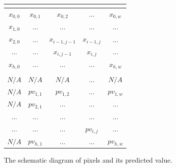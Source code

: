 \begin{figure}
	\centering
	\begin{tabular}{|c|c|c|c|c|} 
		
		\multicolumn{1}{c}{\phantom{$x_{i-1, j-1}$}} & \multicolumn{1}{c}{\phantom{$x_{i-1, j-1}$}} &
		\multicolumn{1}{c}{\phantom{$x_{i-1, j-1}$}} & \multicolumn{1}{c}{\phantom{$x_{i-1, j-1}$}} & \multicolumn{1}{c}{\phantom{$x_{i-1, j-1}$}}  
		\\
		\hline
		$x_{0, 0}$ & $x_{0, 1}$ & $x_{0, 2}$      & $\dots$    & $x_{0, w}$ \\ \hline
		$x_{1, 0}$ & $\dots$    & $\dots$         & $\dots$    & $\dots$    \\ \hline 
		$x_{2, 0}$ & $\dots$    & 
		\cellcolor{black!10} $x_{i-1, j-1}$ & \cellcolor{black!10}$x_{i - 1, j}$ & $\dots$   \\ \hline 
		$\dots$    & $\dots$    & 
		\cellcolor{black!10}$x_{i, j - 1}$  & \cellcolor{black!20}$x_{i, j}$     & $\dots$    \\ \hline 
		$x_{h, 0}$ & $\dots$    & $\dots$          & $\dots$        & $x_{h, w}$ \\ \hline 
		
		\multicolumn{5}{c}{{}}\\
		
		\hline
		\rowcolor{black!30}
		\cellcolor{black!30}$N/A$   & $N/A$       & $N/A$       & $\dots$                         & $N/A$       \\ \hline
		\cellcolor{black!30}$N/A$   & $pv_{1, 1}$ & $pv_{1, 2}$ & $\dots$                         & $pv_{1, w}$ \\ \hline
		\cellcolor{black!30}$N/A$   & $pv_{2, 1}$ & $\dots$     & $\dots$                         & $\dots$     \\ \hline 
		\cellcolor{black!30}$\dots$ & $\dots$     & $\dots$     & $\dots$                         & $\dots$     \\ \hline 
		\cellcolor{black!30}$\dots$ & $\dots$     & $\dots$     & \cellcolor{black!20}$pv_{i, j}$ & $\dots$     \\ \hline 
		\cellcolor{black!30}$N/A$   & $pv_{h, 1}$ & $\dots$     & $\dots$                         & $pv_{h, w}$ \\ \hline 
	\end{tabular}
	
	
	
	\caption{The schematic diagram of pixels and its predicted value.}
	\label{fig:xpv}
\end{figure}

